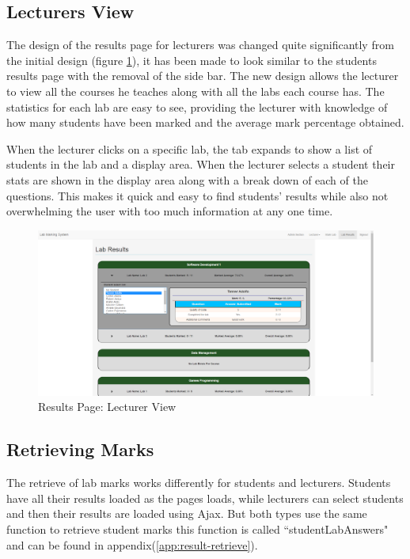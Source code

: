 \documentclass[11pt]{report}
\begin{document}
\subsection*{Lecturers View} \label{sec:results-lecturer}

The design of the results page for lecturers was changed quite significantly from the initial design (figure \ref{fig:results-lecturer}), it has been made to look similar to the students results page with the removal of the side bar. The new design allows the lecturer to view all the courses he teaches along with all the labs each course has. The statistics for each lab are easy to see, providing the lecturer with knowledge of how many students have been marked and the average mark percentage obtained.

When the lecturer clicks on a specific lab, the tab expands to show a list of students in the lab and a display area. When the lecturer selects a student their stats are shown in the display area along with a break down of each of the questions. This makes it quick and easy to find students' results while also not overwhelming the user with too much information at any one time.

\begin{figure}[H]
    \centering
    \includegraphics[width=1\textwidth]{images/implementation/lecturer-results-page.png}
    \caption{Results Page: Lecturer View}
    \label{fig:results-lecturer}
\end{figure}


\subsection{Retrieving Marks}

The retrieve of lab marks works differently for students and lecturers. Students have all their results loaded as the pages loads, while lecturers can select students and then their results are loaded using Ajax. But both types use the same function to retrieve student marks this function is called ``studentLabAnswers" and can be found in appendix(\ref{app:result-retrieve}). 
\end{document}
